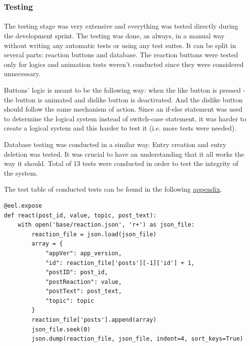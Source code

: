 \documentclass[12pt]{report}
\newenvironment{code}{\captionsetup{type=listing}}{}
\begin{document}
\subsubsection*{Testing}
\paragraph{}
The testing stage was very extensive and everything was tested directly during the development sprint. 
The testing was done, as always, in a manual way without writing any automatic tests or using any test suites.
It can be split in several parts: reaction buttons and database. The reaction buttons were tested only for logics and
animation tests weren't conducted since they were considered unnecessary.

Buttons' logic is meant to be the following way: when the like button is pressed - the button is animated and dislike
button is deactivated. And the dislike button should follow the same mechanism of action. Since an if-else statement
was used to determine the logical system instead of switch-case statement, it was harder to create a logical system
and this harder to test it (i.e. more tests were needed).

Database testing was conducted in a similar way. Entry creation and entry deletion was tested. It was crucial to 
have an understanding that it all works the way it should. Total of 13 tests were conducted in order to test the integrity of the system.

The test table of conducted tests can be found in the following \hyperref[appendix:reaction_system_testing]{appendix}.

\begin{code}
\begin{verbatim}
@eel.expose
def react(post_id, value, topic, post_text):
    with open('base/reaction.json', 'r+') as json_file:
        reaction_file = json.load(json_file)
        array = {
            "appVer": app_version,
            "id": reaction_file['posts'][-1]['id'] + 1,
            "postID": post_id,
            "postReaction": value,
            "postText": post_text,
            "topic": topic
        }
        reaction_file['posts'].append(array)
        json_file.seek(0)
        json.dump(reaction_file, json_file, indent=4, sort_keys=True)
\end{verbatim}
\end{code}
\end{document}

